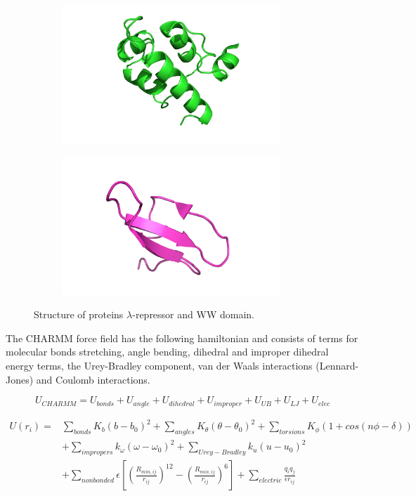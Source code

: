 \begin{figure}[H]
  \centering
  \begin{subfigure}[t]{0.45\textwidth}
    \includegraphics[width=0.9\textwidth]{figures3/lambda-repressor.png} 
  \end{subfigure}
  \begin{subfigure}[t]{0.45\textwidth}
    \includegraphics[width=0.9\textwidth]{figures3/ww-domain.png}  
  \end{subfigure}
  \caption{Structure of proteins $\lambda$-repressor and WW domain.}
  \label{fig:NN}
\end{figure}


The CHARMM force field has the following hamiltonian and consists of terms for molecular bonds stretching, angle bending, dihedral and improper dihedral energy terms, the Urey-Bradley component, van der Waals interactions (Lennard-Jones) and Coulomb interactions. 

$$U_{CHARMM}=U_{bonds}+U_{angle}+U_{dihedral}+U_{improper}+U_{UB}+U_{LJ}+U_{elec}$$

\begin{equation}
\begin{aligned}
U(r_{i})={} &\sum_{bonds}K_{b}(b-b_{0})^{2}+\sum_{angles}K_{\theta}(\theta-\theta_{0})^{2}+\sum_{torsions}K_{\phi}\left(1+cos(n\phi-\delta)\right)\\
&+\sum_{impropers}k_{\omega}\left(\omega-\omega_{0}\right)^{2}+\sum_{Urey-Bradley}k_{u}\left(u-u_{0}\right)^{2}\\
&+\sum_{nonbonded}\epsilon\left[\left(\frac{R_{min,ij}}{r_{ij}}\right)^{12}-\left(\frac{R_{min,ij}}{r_{ij}}\right)^{6}\right]+\sum_{electric}\frac{q_{i}q_{j}}{\epsilon r_{ij}}
\end{aligned}
\end{equation}

